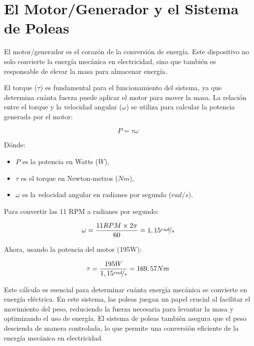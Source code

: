     \section{El Motor/Generador y el Sistema de Poleas}
        
        El motor/generador es el corazón de la conversión de energía. Este dispositivo no solo convierte la energía mecánica en electricidad, sino que también es responsable de elevar la masa para almacenar energía.\par
        El torque ($\tau$) es fundamental para el funcionamiento del sistema, ya que determina cuánta fuerza puede aplicar el motor para mover la masa. La relación entre el torque y la velocidad angular ($\omega$) se utiliza para calcular la potencia generada por el motor:\par

        \begin{equation}
            P = \tau\omega
        \end{equation}

        Dónde:\par

        \begin{itemize} [label=•]
            \setlength{\itemindent}{1.5em}
            
            \item $P$ es la potencia en Watts ($W$),
            \item $\tau$ es el torque en Newton-metros ($Nm$),
            \item $\omega$ es la velocidad angular en radianes por segundo ($rad/s$).
        \end{itemize}

        Para convertir las 11 RPM a radianes por segundo:\par

        \begin{equation*}
            \omega = \frac{11RPM \times 2\pi}{60} = 1,15 \nicefrac{rad}{s}
        \end{equation*}

        Ahora, usando la potencia del motor (195W):\par

        \begin{equation}
            \tau = \frac{195W}{1,15 \nicefrac{rad}{s}} = 169,57 Nm
        \end{equation}

        Este cálculo es esencial para determinar cuánta energía mecánica se convierte en energía eléctrica. En este sistema, las poleas juegan un papel crucial al facilitar el movimiento del peso, reduciendo la fuerza necesaria para levantar la masa y optimizando el uso de energía. El sistema de poleas también asegura que el peso descienda de manera controlada, lo que permite una conversión eficiente de la energía mecánica en electricidad.\par

